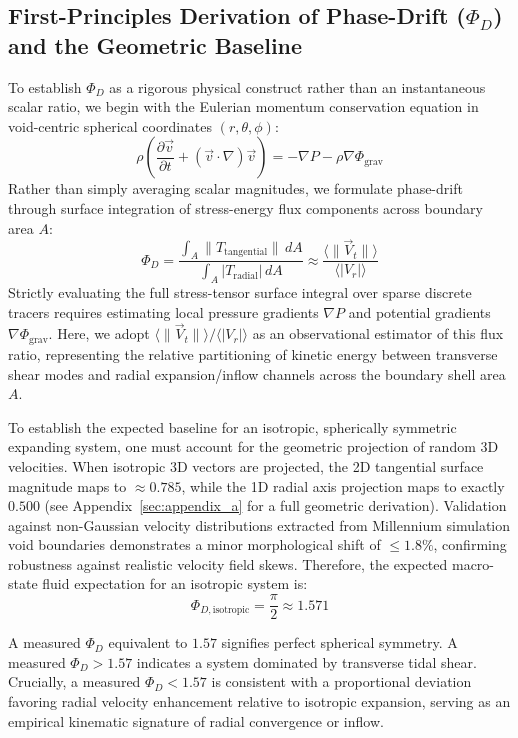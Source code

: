 \documentclass[trackchanges]{aastex631}
\begin{document}
\subsection{First-Principles Derivation of Phase-Drift (\texorpdfstring{$\Phi_D$}{Phi\_D}) and the Geometric Baseline}
To establish $\Phi_D$ as a rigorous physical construct rather than an instantaneous scalar ratio, we begin with the Eulerian momentum conservation equation in void-centric spherical coordinates $(r, \theta, \phi)$:
\begin{equation}
\rho\left(\frac{\partial\vec{v}}{\partial t} + (\vec{v}\cdot\nabla)\vec{v}\right) = -\nabla P - \rho\nabla\Phi_{\text{grav}}
\end{equation}
Rather than simply averaging scalar magnitudes, we formulate phase-drift through surface integration of stress-energy flux components across boundary area $A$:
\begin{equation}
\Phi_D = \frac{\int_A \|T_{\text{tangential}}\| \, dA}{\int_A |T_{\text{radial}}| \, dA} \approx \frac{\langle \|\vec{V}_t\| \rangle}{\langle |V_r| \rangle}
\end{equation}
Strictly evaluating the full stress-tensor surface integral over sparse discrete tracers requires estimating local pressure gradients $\nabla P$ and potential gradients $\nabla\Phi_{\text{grav}}$. Here, we adopt $\langle \|\vec{V}_t\| \rangle / \langle |V_r| \rangle$ as an observational estimator of this flux ratio, representing the relative partitioning of kinetic energy between transverse shear modes and radial expansion/inflow channels across the boundary shell area $A$.

To establish the expected baseline for an isotropic, spherically symmetric expanding system, one must account for the geometric projection of random 3D velocities. When isotropic 3D vectors are projected, the 2D tangential surface magnitude maps to $\approx 0.785$, while the 1D radial axis projection maps to exactly $0.500$ (see Appendix~\ref{sec:appendix_a} for a full geometric derivation). Validation against non-Gaussian velocity distributions extracted from Millennium simulation void boundaries demonstrates a minor morphological shift of $\le 1.8\%$, confirming robustness against realistic velocity field skews. Therefore, the expected macro-state fluid expectation for an isotropic system is:
\begin{equation}
\Phi_{D,\text{isotropic}} = \frac{\pi}{2} \approx 1.571
\end{equation}

A measured $\Phi_D$ equivalent to $1.57$ signifies perfect spherical symmetry. A measured $\Phi_D > 1.57$ indicates a system dominated by transverse tidal shear. Crucially, a measured $\Phi_D < 1.57$ is consistent with a proportional deviation favoring radial velocity enhancement relative to isotropic expansion, serving as an empirical kinematic signature of radial convergence or inflow.
\end{document}
